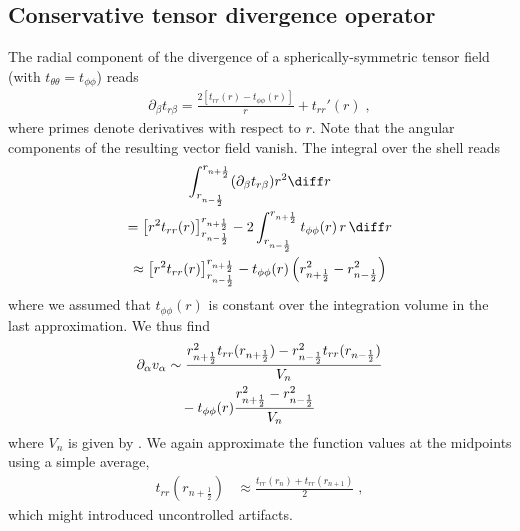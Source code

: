 \documentclass[
	superscriptaddress,
	twocolumn,
	aps, pre
]{revtex4-1}
\begin{document}
\subsection{Conservative tensor divergence operator}
The radial component of the divergence of a spherically-symmetric tensor field (with $t_{\theta\theta} = t_{\phi\phi}$) reads
\begin{align}
	\partial_\beta t_{r\beta} =
		\frac{2 \left[t_{rr}(r)-t_{\phi \phi }(r)\right]}{r}+t_{rr}'(r)
	\;,
\end{align}
where primes denote derivatives with respect to $r$.
Note that the angular components of the resulting vector field vanish.
The integral over the shell reads
\begin{multline}
	\int_{r_{n-\frac12}}^{r_{n + \frac12}} (\partial_\beta t_{r\beta})  r^2 \diff r 
\\	
	 = \left[r^2 t_{rr}(r)\right]_{r_{n-\frac12}}^{r_{n + \frac12}}
	  - 2 \int_{r_{n-\frac12}}^{r_{n + \frac12}} t_{\phi \phi }(r) \, r \, \diff r 
\\
	 \approx \left[r^2 t_{rr}(r)\right]_{r_{n-\frac12}}^{r_{n + \frac12}}
	  - t_{\phi \phi }(r) \left(
	  	r_{n+\frac12}^2 - r_{n-\frac12}^2
	  \right)
\end{multline}
where we assumed that $t_{\phi\phi}(r)$ is constant over the integration volume in the last approximation.
We thus find
\begin{align}
	\partial_\alpha v_{\alpha} &\sim
	 \frac{r_{n + \frac12}^2 t_{rr}(r_{n + \frac12}) - r_{n - \frac12}^2 t_{rr}(r_{n - \frac12})}{V_n}
\\\notag & \quad - t_{\phi \phi }(r) \frac{r_{n+\frac12}^2 - r_{n-\frac12}^2}{V_n}
\end{align}
where $V_n$ is given by . 
We again approximate the function values at the midpoints using a simple average,
\begin{align}
	t_{rr}(r_{n + \frac12}) &\approx \frac{t_{rr}(r_{n}) + t_{rr}(r_{n+1})}{2}
	\;,
\end{align}
which might introduced uncontrolled artifacts.
\end{document}
